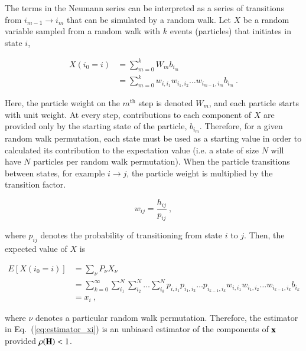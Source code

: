 \documentclass[preprint,12pt]{elsarticle}
\newcommand{\vx}{\ensuremath{\ve{x}}}
\newcommand{\vH}{\ensuremath{\ve{H}}}
\begin{document}
The terms in the Neumann series can be interpreted as a series of
transitions from $i_{m-1}\rightarrow i_m$ that can be simulated by a
random walk.  Let $X$ be a random variable sampled from a random walk
with $k$ events (particles) that initiates in state $i$,

\begin{equation}
  \begin{split}
    X(i_0 = i) &= \sum_{m=0}^{k}W_m b_{i_m}\\
    &= \sum_{m=0}^{k}w_{i,i_1}w_{i_1,i_2}\ldots
    w_{i_{m-1},i_m}b_{i_m}\:.
  \end{split}
  \label{eq:estimator_xi}
\end{equation}

Here, the particle weight on the $m^\text{th}$ step is denoted $W_m$,
and each particle starts with unit weight. At every step,
contributions to each component of $X$ are provided only by the
starting state of the particle, $b_{i_m}$. Therefore, for a given
random walk permutation, each state must be used as a starting value
in order to calculated its contribution to the expectation value
(i.e. a state of size $N$ will have $N$ particles per random walk
permutation). When the particle transitions between states, for
example $i\rightarrow j$, the particle weight is multiplied by the
transition factor.

\begin{equation}
  w_{ij} = \frac{h_{ij}}{p_{ij}}\:,
  \label{eq:weight}
\end{equation}

where $p_{ij}$ denotes the probability of transitioning from state $i$
to $j$. Then, the expected value of $X$ is

\begin{equation}
  \begin{split}
    E[X(i_0=i)] &= \sum_{\nu}P_\nu X_\nu\\
    &= \sum_{k=0}^{\infty}\sum_{i_1}^{N}\sum_{i_2}^{N}\ldots
    \sum_{i_k}^{N}p_{i,i_1}p_{i_1,i_2}\ldots p_{i_{k-1},i_k}
    w_{i,i_1}w_{i_1,i_2}\dots w_{i_{k-1},i_k}b_{i_k}\\
    &= x_i\:,
  \end{split}
  \label{eq:expectation_xi}
\end{equation}

where $\nu$ denotes a particular random walk permutation.
Therefore, the estimator in Eq.~(\ref{eq:estimator_xi}) is an unbiased
estimator of the components of $\vx$ provided $\rho(\vH) < 1$.
\end{document}
